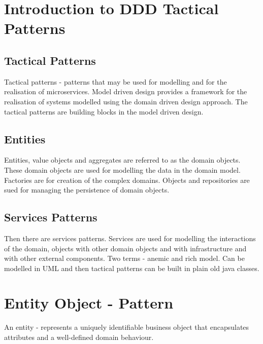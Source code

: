 \documentclass[a4paper, 11pt]{book}
\begin{document}
    \section{Introduction to DDD Tactical Patterns}
    \subsection{Tactical Patterns}
    Tactical patterns - patterns that may be used for modelling and for the realisation of microservices.
    Model driven design provides a framework for the realisation of systems modelled using the domain driven design approach.
    The tactical patterns are building blocks in the model driven design.

    \subsection{Entities}
    Entities, value objects and aggregates are referred to as the domain objects.
    These domain objects are used for modelling the data in the domain model.
    Factories are for creation of the complex domains.
    Objects and repositories are sued for managing the persistence of domain objects.

    \subsection{Services Patterns}
    Then there are services patterns.
    Services are used for modelling the interactions of the domain, objects with other domain objects and with infrastructure and with other external components. %
    Two terms - anemic and rich model.
    Can be modelled in UML and then tactical patterns can be built in plain old java classes.

    \section{Entity Object - Pattern}

    An entity - represents a uniquely identifiable business object that encapsulates attributes and a well-defined domain behaviour.
\end{document}

